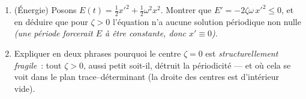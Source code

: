 \begin{problem}
\begin{enumerate}[resume]
        fonction \emph{décroissante} de $\zeta \geq 1$~:
        l'amortissement critique $\zeta = 1$ donne le retour au
        repos non oscillant le plus rapide.
  \item (Énergie) Posons $E(t) = \frac12x'^2 +
        \frac12\omega^2x^2$. Montrer que $E' = -2\zeta\omega\,x'^2
        \leq 0$, et en déduire que pour $\zeta > 0$ l'équation
        n'a aucune solution périodique non nulle \emph{(une
        période forcerait $E$ à être constante, donc $x' \equiv
        0$)}.
  \item Expliquer en deux phrases pourquoi le centre $\zeta = 0$
        est \emph{structurellement fragile}~: tout $\zeta > 0$,
        aussi petit soit-il, détruit la périodicité --- et où
        cela se voit dans le plan trace--déterminant (la droite
        des centres est d'intérieur vide).
\end{enumerate}


\end{problem}
